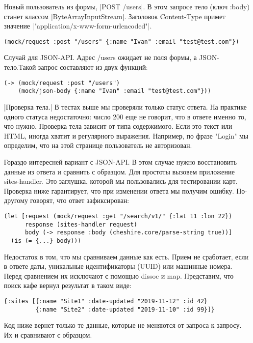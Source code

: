 Новый пользователь из формы, \spverb|POST /users|. В этом запросе тело (ключ :body)
станет классом \spverb|ByteArrayInputStream|. Заголовок Content-Type примет значение
\spverb|"application/x-www-form-urlencoded"|.

\begin{verbatim}
(mock/request :post "/users" {:name "Ivan" :email "test@test.com"})
\end{verbatim}

Случай для JSON-API. Адрес /users ожидает не поля формы, а JSON-тело.Такой
запрос составляют из двух функций:

\begin{verbatim}
(-> (mock/request :post "/users")
    (mock/json-body {:name "Ivan" :email "test@test.com"}))
\end{verbatim}

\spverb|Проверка тела.| В тестах выше мы проверяли только статус ответа. На практике
одного статуса недостаточно: число 200 еще не говорит, что в ответе именно то,
что нужно. Проверка тела зависит от типа содержимого. Если это текст или HTML,
иногда хватит и регулярного выражения. Например, по фразе "Login" мы определим,
что на этой странице пользователь не авторизован.

Гораздо интересней вариант с JSON-API. В этом случае нужно восстановить данные
из ответа и сравнить с образцом. Для простоты вызовем приложение
sites-handler. Это заглушка, которой мы пользовались для тестировании
карт. Проверка ниже гарантирует, что при изменении ответа мы получим
ошибку. По-другому говорят, что ответ зафиксирован:

\begin{verbatim}
(let [request (mock/request :get "/search/v1/" {:lat 11 :lon 22})
      response (sites-handler request)
      body (-> response :body (cheshire.core/parse-string true))]
  (is (= {...} body)))
\end{verbatim}

Недостаток в том, что мы сравниваем данные как есть. Прием не сработает, если в
ответе даты, уникальные идентификаторы (UUID) или машинные номера. Перед
сравнением их исключают с помощью dissoc и map. Представим, что поиск кафе
вернул результат в таком виде:

\begin{verbatim}
{:sites [{:name "Site1" :date-updated "2019-11-12" :id 42}
         {:name "Site2" :date-updated "2019-11-10" :id 99}]}
\end{verbatim}

Код ниже вернет только те данные, которые не меняются от запроса к запросу. Их и
сравнивают с образцом.

